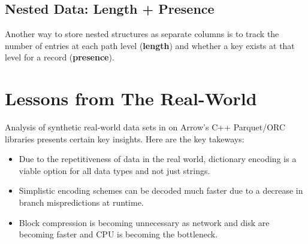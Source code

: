 \documentclass[11pt]{article}
\begin{document}
\subsection*{Nested Data: Length + Presence}
Another way to store nested structures as separate columns is to track the number of entries at each path level (\textbf{length}) and whether a key exists at that level for a record (\textbf{presence}).

\section{Lessons from The Real-World}
Analysis of synthetic real-world data sets in \cite{zeng2023empirical} on Arrow's C++ Parquet/ORC libraries presents certain key insights. Here are the key takeways:
\begin{itemize}
    \item Due to the repetitiveness of data in the real world, dictionary encoding is a viable option for all data types and not just strings.
    \item Simplistic encoding schemes can be decoded much faster due to a decrease in branch mispredictions at runtime.
    \item Block compression is becoming unnecessary as network and disk are becoming faster and CPU is becoming the bottleneck.
\end{itemize}



\newpage


\end{document}
